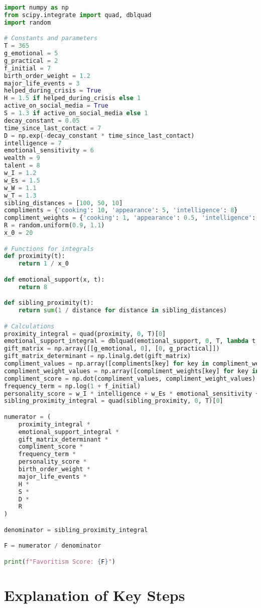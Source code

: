 \documentclass[12pt]{article}
\begin{document}
\begin{lstlisting}[language=Python]
import numpy as np
from scipy.integrate import quad, dblquad
import random

# Constants and parameters
T = 365
g_emotional = 5
g_practical = 2
f_initial = 7
birth_order_weight = 1.2
major_life_events = 3
helped_during_crisis = True
H = 1.5 if helped_during_crisis else 1
active_on_social_media = True
S = 1.3 if active_on_social_media else 1
decay_constant = 0.05
time_since_last_contact = 7
D = np.exp(-decay_constant * time_since_last_contact)
intelligence = 7
emotional_sensitivity = 6
wealth = 9
talent = 8
w_I = 1.2
w_Es = 1.5
w_W = 1.1
w_T = 1.3
sibling_distances = [100, 50, 10]
compliments = {'cooking': 10, 'appearance': 5, 'intelligence': 8}
compliment_weights = {'cooking': 1, 'appearance': 0.5, 'intelligence': 0.75}
R = random.uniform(0.9, 1.1)
x_0 = 20

# Functions for integrals
def proximity(t):
    return 1 / x_0

def emotional_support(x, t):
    return 8

def sibling_proximity(t):
    return sum(1 / distance for distance in sibling_distances)

# Calculations
proximity_integral = quad(proximity, 0, T)[0]
emotional_support_integral = dblquad(emotional_support, 0, T, lambda t: 0, lambda t: 1)[0]
gift_matrix = np.array([[g_emotional, 0], [0, g_practical]])
gift_matrix_determinant = np.linalg.det(gift_matrix)
compliment_values = np.array([compliments[key] for key in compliment_weights])
compliment_weight_values = np.array([compliment_weights[key] for key in compliment_weights])
compliment_score = np.dot(compliment_values, compliment_weight_values)
frequency_term = np.log(1 + f_initial)
personality_score = w_I * intelligence + w_Es * emotional_sensitivity + w_W * wealth + w_T * talent
sibling_proximity_integral = quad(sibling_proximity, 0, T)[0]

numerator = (
    proximity_integral *
    emotional_support_integral *
    gift_matrix_determinant *
    compliment_score *
    frequency_term *
    personality_score *
    birth_order_weight *
    major_life_events *
    H *
    S *
    D *
    R
)

denominator = sibling_proximity_integral

F = numerator / denominator

print(f"Favoritism Score: {F}")
\end{lstlisting}

\section{Explanation of Key Steps}
\end{document}
